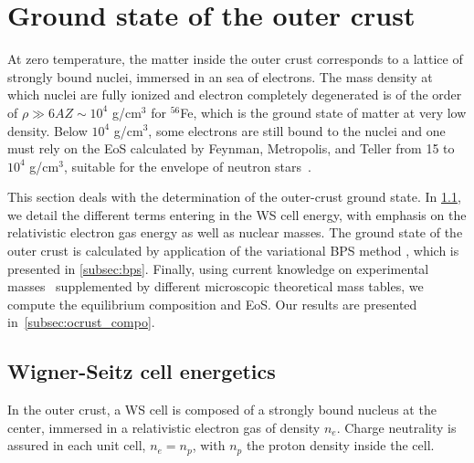 \minitoc\newpage

\section{Ground state of the outer crust}\label{sec:ocrust_gs}

At zero temperature, the matter inside the outer crust corresponds to a 
lattice of strongly bound nuclei, immersed in an sea of electrons. The mass 
density at which nuclei are fully ionized and electron completely degenerated 
is of the order of $\rho \gg 6AZ \sim 10^4$ g/cm$^3$ for $^{56}$Fe, which is
the ground state of matter at very low density. Below $10^4$ g/cm$^3$, some 
electrons are still bound to the nuclei and one must rely on the EoS 
calculated by Feynman, Metropolis, and Teller from 15 to $10^4$ g/cm$^3$, 
suitable for the envelope of neutron stars~\cite{Feynman1949}.

This section deals with the determination of the outer-crust ground state. 
In \ref{subsec:ws}, we detail the different terms entering in the WS cell 
energy, with emphasis on the relativistic electron gas energy as well as 
nuclear masses. The ground state of the outer crust is calculated by
application of the variational BPS method \cite{BPS}, which is 
presented in \ref{subsec:bps}. Finally, using current knowledge on experimental
masses~\cite{Huang2017} supplemented by different microscopic theoretical mass
tables, we compute the equilibrium composition and EoS. Our results are
presented in~\ref{subsec:ocrust_compo}.

\subsection{Wigner-Seitz cell energetics}\label{subsec:ws}

In the outer crust, a WS cell is composed of a strongly bound nucleus at the 
center, immersed in a relativistic electron gas of 
density $n_e$. Charge neutrality is assured in each unit cell, 
$n_e = n_p$, with $n_p$ the proton density inside the cell.

